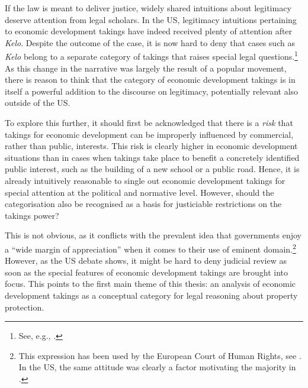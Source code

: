 
If the law is meant to deliver justice, widely shared intuitions about legitimacy deserve attention from legal scholars. In the US, legitimacy intuitions pertaining to economic development takings have indeed received plenty of attention after {\it Kelo}. Despite the outcome of the case, it is now hard to deny that cases such as {\it Kelo} belong to a separate category of takings that raises special legal questions.\footnote{See, e.g., \cite{cohen06,somin07}.} As this change in the narrative was largely the result of a popular movement, there is reason to think that the category of economic development takings is in itself a powerful addition to the discourse on legitimacy, potentially relevant also outside of the US.

To explore this further, it should first be acknowledged that there is a {\it risk} that takings for economic development can be improperly influenced by commercial, rather than public, interests. This risk is clearly higher in economic development situations than in cases when takings take place to benefit a concretely identified public interest, such as the building of a new school or a public road. Hence, it is already intuitively reasonable to single out economic development takings for special attention at the political and normative level. However, should the categorisation also be recognised as a basis for justiciable restrictions on the takings power?

This is not obvious, as it conflicts with the prevalent idea that governments enjoy a ``wide margin of appreciation'' when it comes to their use of eminent domain.\footnote{This expression has been used by the European Court of Human Rights, see \cite[54]{james86}. In the US, the same attitude was clearly a factor motivating the majority in \cite{kelo05}.} However, as the US debate shows, it might be hard to deny judicial review as soon as the special features of economic development takings are brought into focus. This points to the first main theme of this thesis: an analysis of economic development takings as a conceptual category for legal reasoning about property protection.

